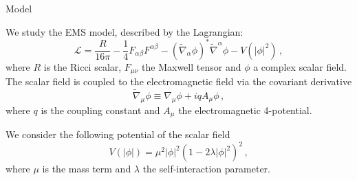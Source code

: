 \begin{block}{Model}

We study the \gls{EMS} model, described by the Lagrangian:
%
\begin{equation}
    \mathcal{L} =
        \frac{R}{16 \pi} -
        \frac{1}{4} F_{\alpha \beta} F^{\alpha \beta} -
        (\widetilde{\nabla}_\alpha \phi)^* \widetilde{\nabla}^\alpha \phi - V(\left| \phi \right|^2)
    \,,
\end{equation}
%
where $R$ is the Ricci scalar, $F_{\mu \nu}$ the Maxwell tensor and $\phi$ a complex scalar field. The scalar field is coupled to the electromagnetic field via the covariant derivative
%
\begin{equation}
    \widetilde{\nabla}_\mu \phi \equiv \nabla_\mu \phi + i q A_\mu \phi \,,
\end{equation}
%
where $q$ is the coupling constant and $A_\mu$ the electromagnetic 4-potential.

We consider the following potential of the scalar field
%
\begin{equation}
    V(|\phi|) = \mu^2 |\phi|^2 (1 - 2 \lambda |\phi|^2)^2 \,,
\end{equation}
%
where $\mu$ is the mass term and $\lambda$ the self-interaction parameter.

\end{block}
